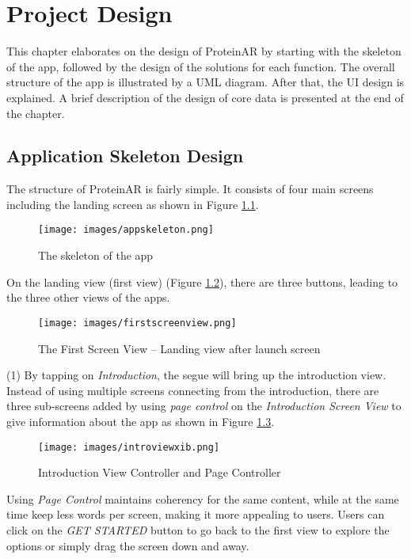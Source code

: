 \chapter{Project Design}
\label{ch:design}

This chapter elaborates on the design of ProteinAR by starting with the skeleton of the app, followed by the design of the solutions for each function. The overall structure of the app is illustrated by a UML diagram. After that, the UI design is explained. A brief description of the design of core data is presented at the end of the chapter.

\section{Application Skeleton Design}
The structure of ProteinAR is fairly simple. It consists of four main screens including the landing screen as shown in Figure \ref{fig:appskeleton}. 
\begin{figure}[!htp]
	\centering
	\texttt{[image: images/appskeleton.png]}
	\caption{The skeleton of the app}
	\label{fig:appskeleton}
\end{figure}

On the landing view (first view) (Figure \ref{fig:firstview}), there are three buttons, leading to the three other views of the apps. 
\begin{figure}[!htp]
	\centering
	\texttt{[image: images/firstscreenview.png]}
	\caption{The First Screen View – Landing view after launch screen}
	\label{fig:firstview}
\end{figure}

(1) By tapping on \emph{Introduction}, the segue will bring up the introduction view. Instead of using multiple screens connecting from the introduction, there are three sub-screens added by using \emph{page control} on the \emph{Introduction Screen View} to give information about the app as shown in Figure \ref{fig:introviewxib}.
\begin{figure}[!htp]
	\centering
	\texttt{[image: images/introviewxib.png]}
	\caption{Introduction View Controller and Page Controller}
	\label{fig:introviewxib}
\end{figure}
Using \emph{Page Control} maintains coherency for the same content, while at the same time keep less words per screen, making it more appealing to users. Users can click on the \emph{GET STARTED} button to go back to the first view to explore the options or simply drag the screen down and away.

